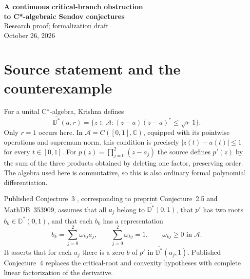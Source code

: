 \documentclass[11pt]{article}
\newcommand{\A}{\mathcal A}
\newcommand{\D}{\overline{\mathbb D^*}}
\begin{document}
\begin{center}
{\Large\bfseries A continuous critical-branch obstruction\\to C*-algebraic Sendov conjectures}\\[.5em]
Research proof; formalization draft\\
October 26, 2026
\end{center}
\begin{abstract}
We give a cubic in the commutative unital C*-algebra
$C([0,1],\mathbb C)$ whose roots have norm at most $9/10$, whose derivative
splits completely into two distinct continuous critical branches of norm
less than one, and whose critical branches are positive continuous convex
combinations of the original roots. Nevertheless, every critical element
has distance greater than $21/20$ from one fixed root. This contradicts
Conjecture~3 of Krishna's published C*-algebraic Sendov paper, originally
Conjecture~2.5 of its preprint, and its completely split derivative variant
(published Conjecture~4). The obstruction concerns the existence of one
global continuous critical element. It does not contradict scalar Sendov.
The two source formulations are treated as one combined outcome.
\end{abstract}

\section{Source statement and the counterexample}
For a unital C*-algebra, Krishna \cite[Definition~2]{K26} defines
\[
 \D(a,r)=\{z\in\A:(z-a)(z-a)^*\le\sqrt r\,1\}.
\]
Only $r=1$ occurs here. In $\A=C([0,1],\mathbb C)$, equipped with its
pointwise operations and supremum norm, this condition is precisely
$|z(t)-a(t)|\le1$ for every $t\in[0,1]$.
For $p(z)=\prod_{j=0}^2(z-a_j)$ the source defines $p'(z)$ by the sum of
the three products obtained by deleting one factor, preserving order.
The algebra used here is commutative, so this is also ordinary formal
polynomial differentiation.

Published Conjecture~3 \cite[p.~60]{K26}, corresponding to preprint
Conjecture~2.5 \cite{K22} and MathDB~353909, assumes that all $a_j$
belong to $\D(0,1)$, that $p'$ has two roots $b_k\in\D(0,1)$, and
that each $b_k$ has a representation
\begin{equation}\label{convex}
 b_k=\sum_{j=0}^2\omega_{kj}a_j,\qquad
 \sum_{j=0}^2\omega_{kj}=1,\qquad \omega_{kj}\ge0\text{ in }\A.
\end{equation}
It asserts that for each $a_j$ there is a zero $b$ of $p'$ in
$\D(a_j,1)$. Published Conjecture~4 replaces the critical-root and convexity
hypotheses with complete linear factorization of the derivative.
\end{document}
